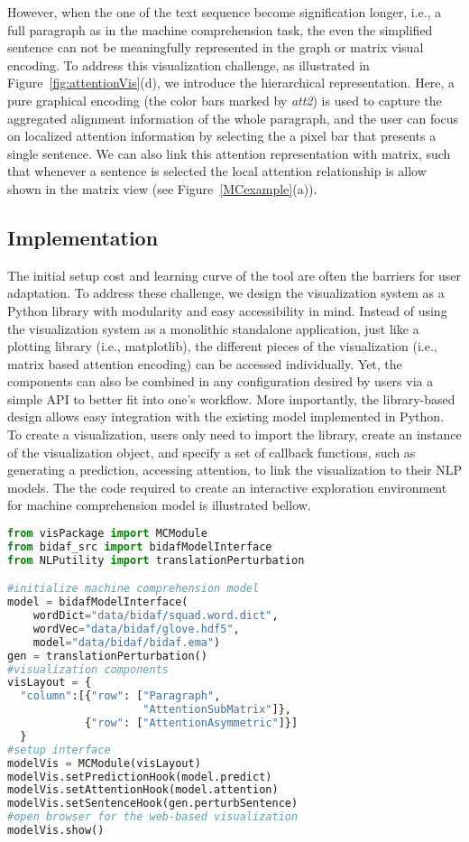 However, when the one of the text sequence become signification longer, i.e., a full paragraph as in the machine comprehension task, the even the simplified sentence can not be meaningfully represented in the graph or matrix visual encoding. To address this visualization challenge, as illustrated in Figure~\ref{fig:attentionVis}(d), we introduce the hierarchical representation. Here, a pure graphical encoding (the color bars marked by \emph{att2}) is used to capture the aggregated alignment information of the whole paragraph, and the user can focus on localized attention information by selecting the a pixel bar that presents a single sentence. We can also link this attention representation with matrix, such that whenever a sentence is selected the local attention relationship is allow shown in the matrix view (see Figure~\ref{MCexample}(a)).

\subsection{Implementation}
The initial setup cost and learning curve of the tool are often the barriers for user adaptation. To address these challenge, we design the visualization system as a Python library with modularity and easy accessibility in mind.
Instead of using the visualization system as a monolithic standalone application, just like a plotting library (i.e., matplotlib), the different pieces of the visualization (i.e., matrix based attention encoding) can be accessed individually.
% 
Yet, the components can also be combined in any configuration desired by users via a simple API to better fit into one's workflow.
More importantly, the library-based design allows easy integration with the existing model implemented in Python.
%
To create a visualization, users only need to import the library, create an instance of the visualization object, and specify a set of callback functions, such as generating a prediction, accessing attention, to link the visualization to their NLP models. The the code required to create an interactive exploration environment for machine comprehension model is illustrated bellow.

\begin{lstlisting}[language=Python, caption=Code for setting up the visualization system shown in Figure~\ref{fig:MCexample}(a).]
from visPackage import MCModule
from bidaf_src import bidafModelInterface
from NLPutility import translationPerturbation

#initialize machine comprehension model
model = bidafModelInterface(
    wordDict="data/bidaf/squad.word.dict",
    wordVec="data/bidaf/glove.hdf5",
    model="data/bidaf/bidaf.ema")
gen = translationPerturbation()
#visualization components
visLayout = {
  "column":[{"row": ["Paragraph", 
                     "AttentionSubMatrix"]},
            {"row": ["AttentionAsymmetric"]}]
  }
#setup interface
modelVis = MCModule(visLayout)
modelVis.setPredictionHook(model.predict)
modelVis.setAttentionHook(model.attention)
modelVis.setSentenceHook(gen.perturbSentence)
#open browser for the web-based visualization
modelVis.show()
\end{lstlisting}




